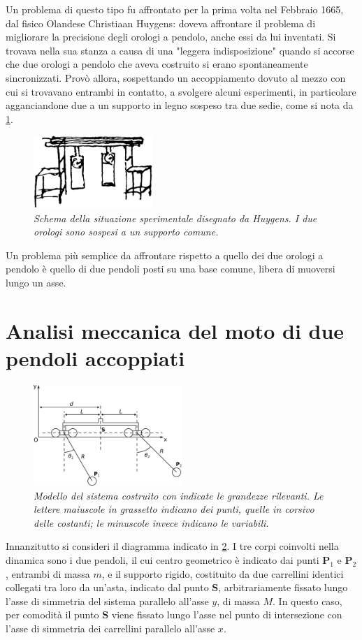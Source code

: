 \documentclass[11pt, a4paper, twoside, italian]{article}
\begin{document}
Un problema di questo tipo fu affrontato per la prima volta nel Febbraio 1665, dal fisico Olandese Christiaan Huygens: doveva affrontare il problema di migliorare la precisione degli orologi a pendolo, anche essi da lui inventati. Si trovava nella sua stanza a causa di una "leggera indisposizione" quando si accorse che due orologi a pendolo che aveva costruito si erano spontaneamente sincronizzati. Provò allora, sospettando un accoppiamento dovuto al mezzo con cui si trovavano entrambi in contatto, a svolgere alcuni esperimenti, in particolare agganciandone due a un supporto in legno sospeso tra due sedie, come si nota da \cref{pendoli_huygens}.
\begin{figure}
    \centering
    \includegraphics[width=0.4\textwidth]{../../media/img/pendolums.png}
    \caption{\textit{Schema della situazione sperimentale disegnato da Huygens. I due orologi sono sospesi a un supporto comune.}}
    \label{pendoli_huygens}
\end{figure}
Un problema più semplice da affrontare rispetto a quello dei due orologi a pendolo è quello di due pendoli posti su una base comune, libera di muoversi lungo un asse.
\section{Analisi meccanica del moto di due pendoli accoppiati}
\begin{figure}[h]
    \centering
    \includegraphics[width=0.5\textwidth]{../../media/cad/sketch_2.pdf}
    \caption{\textit{Modello del sistema costruito con indicate
     le grandezze rilevanti. Le lettere maiuscole in grassetto indicano dei punti, quelle in corsivo delle 
     costanti; le minuscole invece indicano le variabili.} }
    \label{pendolicorpolibero}
\end{figure}
Innanzitutto si consideri il diagramma indicato in \cref{pendolicorpolibero}.
I tre corpi coinvolti nella dinamica sono i due pendoli, il cui centro 
geometrico è indicato dai punti $\mathbf{P}_1$ e $\mathbf{P}_2$, entrambi di massa $m$,
e il supporto rigido, costituito da due carrellini identici collegati tra loro da un'asta,
indicato dal punto $\mathbf{S}$, arbitrariamente fissato lungo l'asse di simmetria del sistema 
parallelo all'asse $y$, di massa $M$. In questo caso, per comodità il punto $\mathbf{S}$ 
viene fissato lungo l'asse nel punto di intersezione con l'asse di simmetria dei carrellini
parallelo all'asse $x$.
\end{document}
